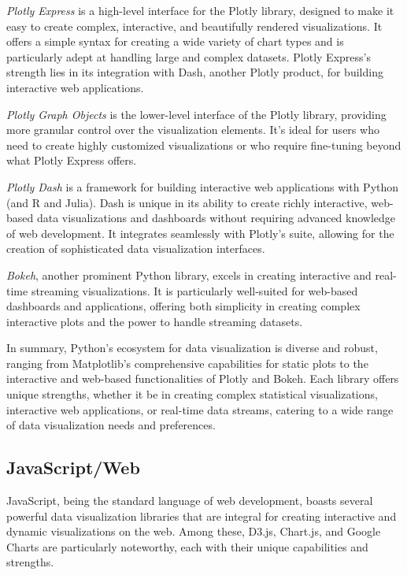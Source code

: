 \emph{Plotly Express} is a high-level interface for the Plotly library, designed to make it easy to create complex, interactive, and beautifully rendered visualizations. It offers a simple syntax for creating a wide variety of chart types and is particularly adept at handling large and complex datasets. Plotly Express's strength lies in its integration with Dash, another Plotly product, for building interactive web applications.

\emph{Plotly Graph Objects} is the lower-level interface of the Plotly library, providing more granular control over the visualization elements. It's ideal for users who need to create highly customized visualizations or who require fine-tuning beyond what Plotly Express offers.

\emph{Plotly Dash} is a framework for building interactive web applications with Python (and R and Julia). Dash is unique in its ability to create richly interactive, web-based data visualizations and dashboards without requiring advanced knowledge of web development. It integrates seamlessly with Plotly's suite, allowing for the creation of sophisticated data visualization interfaces.

\emph{Bokeh}, another prominent Python library, excels in creating interactive and real-time streaming visualizations. It is particularly well-suited for web-based dashboards and applications, offering both simplicity in creating complex interactive plots and the power to handle streaming datasets.

In summary, Python's ecosystem for data visualization is diverse and robust, ranging from Matplotlib's comprehensive capabilities for static plots to the interactive and web-based functionalities of Plotly and Bokeh. Each library offers unique strengths, whether it be in creating complex statistical visualizations, interactive web applications, or real-time data streams, catering to a wide range of data visualization needs and preferences.

\subsection*{JavaScript/Web}

JavaScript, being the standard language of web development, boasts several powerful data visualization libraries that are integral for creating interactive and dynamic visualizations on the web. Among these, D3.js, Chart.js, and Google Charts are particularly noteworthy, each with their unique capabilities and strengths.

